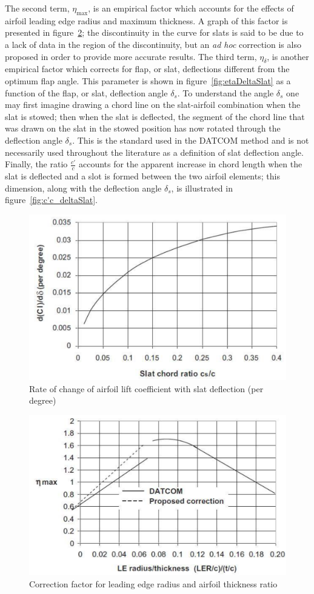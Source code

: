 %
The second term, $\eta_{\text{max}}$, is an empirical factor which accounts for the effects of airfoil leading edge radius and maximum thickness. A graph of this factor is presented in figure~\ref{fig:etaDeltaMaxSlat}; the discontinuity in the curve for slats is said to be due to a lack of data in the region of the discontinuity, but an \emph{ad hoc} correction is also proposed in order to provide more accurate results.
%
The third term, $\eta_\delta$, is another empirical factor which corrects for flap, or slat, deflections different from the optimum flap angle. This parameter is shown in figure~\ref{fig:etaDeltaSlat} as a function of the flap, or slat, deflection angle $\delta_s$. To understand the angle $\delta_s$ one may first imagine
drawing a chord line on the slat-airfoil combination when the slat is stowed; then when the slat is deflected, the segment of the chord line that was drawn on
the slat in the stowed position has now rotated through the deflection angle $\delta_s$. This is the standard used in the \gls{DATCOM} method and is not necessarily used throughout the literature as a definition of slat deflection angle.
%
Finally, the ratio $\frac{c'}{c}$ accounts for the apparent increase in chord length when the slat is deflected and a slot is formed between the two airfoil elements; this dimension, along with the deflection angle $\delta_s$, is illustrated in figure~\ref{fig:c'c_deltaSlat}.
%
\begin{figure}[H]
\centering
\includegraphics[width=0.8\linewidth]{DeltaCl_Ddelta}
\caption{Rate of change of airfoil lift coefficient with slat deflection (per degree)}
\label{fig:dCldDelta}
\end{figure}
%
\begin{figure}[H]
\centering
\includegraphics[width=0.8\linewidth]{Eta_max}
\caption{Correction factor for leading edge radius and airfoil thickness ratio}
\label{fig:etaDeltaMaxSlat}
\end{figure}
